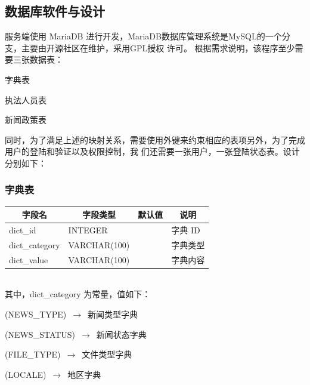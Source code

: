 \documentclass[a4paper, 12pt]{article}
\begin{document}
	\subsection{\normalfont 数据库软件与设计}

	服务端使用 MariaDB 进行开发，MariaDB数据库管理系统是MySQL的一个分支，主要由开源社区在维护，采用GPL授权
	许可。 根据需求说明，该程序至少需要三张数据表：

	\begin{enumerate} 
	{\setlength{\parskip}{-0.3em}
		\item 字典表
		\item 执法人员表
		\item 新闻政策表
	}
	\end{enumerate}

	同时，为了满足上述的映射关系，需要使用外键来约束相应的表项另外，为了完成用户的登陆和验证以及权限控制，我
	们还需要一张用户，一张登陆状态表。设计分别如下：

	\subsubsection{\normalfont 字典表}

	\begin{tabular}{l|l|l|l}
		\toprule
		\multicolumn{1}{c|}{字段名}	& \multicolumn{1}{c|}{字段类型}	& \multicolumn{1}{c|}{默认值}	& \multicolumn{1}{c}{说明} \\
		\midrule
		dict\_id					& INTEGER 						& 								& 字典 ID \\
		\midrule
		dict\_category				& VARCHAR(100) 					& 								& 字典类型 \\
		\midrule
		dict\_value					& VARCHAR(100)					& 								& 字典内容 \\
		\bottomrule
	\end{tabular} \\

	其中，dict\_category 为常量，值如下：

	{\setlist[enumerate,1]{start=0}
		\begin{enumerate} 
		{\setlength{\parskip}{-0.3em}
			\item (NEWS\_TYPE)   $\,\to\,$ 新闻类型字典
			\item (NEWS\_STATUS) $\,\to\,$ 新闻状态字典
			\item (FILE\_TYPE)   $\,\to\,$ 文件类型字典
			\item (LOCALE)       $\,\to\,$ 地区字典
		}
		\end{enumerate}
	}
\end{document}
